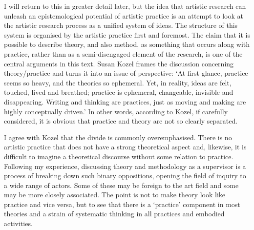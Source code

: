 \documentclass[12pt]{article}
\begin{document}
I will return to this in greater detail later, but the idea that artistic research can unleash an epistemological potential of artistic practice is an attempt to look at the artistic research process as a unified system of ideas. The structure of this system is organised by the artistic practice first and foremost. The claim that it is possible to describe theory, and also method, as something that occurs along with practice, rather than as a semi-disengaged element of the research, is one of the central arguments in this text. Susan Kozel frames the discussion concerning  theory/practice and turns it into an issue of perspective: `At first glance, practice seems so heavy, and the theories so ephemeral. Yet, in reality, ideas are felt, touched, lived and breathed; practice is ephemeral, changeable, invisible and disappearing. Writing and thinking are practices, just as moving and making are highly conceptually driven.' In other words, according to Kozel, if carefully considered, it is obvious that practice and theory are not so clearly separated.


I agree with Kozel that the divide is commonly overemphasised. There is no artistic practice that does not have a strong theoretical aspect and, likewise, it is difficult to imagine a theoretical discourse without some relation to practice. Following my experience, discussing theory and methodology as a supervisor is a process of breaking down such binary oppositions, opening the field of inquiry to a wide range of actors. Some of these may be foreign to the art field and some may be more closely associated. The point is not to make theory look like practice and vice versa, but to see that there is a `practice' component in most theories and a strain of systematic thinking in all practices and embodied activities.
\end{document}
